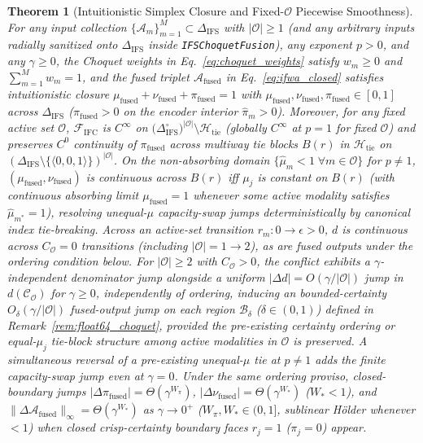 \documentclass[10pt,twocolumn]{article}
\newtheorem{theorem}{Theorem}
\begin{document}
\begin{theorem}[Intuitionistic Simplex Closure and Fixed-$\mathcal{O}$ Piecewise Smoothness]
\label{thm:closure}
For any input collection $\{\mathcal{A}_m\}_{m=1}^M \subset \Delta_{\text{IFS}}$ with
$|\mathcal{O}| \ge 1$ (and any arbitrary inputs radially sanitized onto $\Delta_{\text{IFS}}$
inside \texttt{IFSChoquetFusion}), any exponent $p > 0$, and any $\gamma \ge 0$, the Choquet
weights in Eq.~\eqref{eq:choquet_weights} satisfy $w_m \ge 0$ and $\sum_{m=1}^M w_m = 1$, and
the fused triplet $\mathcal{A}_{\text{fused}}$ in Eq.~\eqref{eq:ifwa_closed} satisfies
intuitionistic closure $\mu_{\text{fused}} + \nu_{\text{fused}} + \pi_{\text{fused}} = 1$ with
$\mu_{\text{fused}}, \nu_{\text{fused}}, \pi_{\text{fused}} \in [0, 1]$ across
$\Delta_{\text{IFS}}$ ($\pi_{\text{fused}} > 0$ on the encoder interior $\hat{\pi}_m > 0$).
Moreover, for any fixed active set $\mathcal{O}$, $\mathcal{F}_{\text{IFC}}$ is $C^\infty$ on
$\big(\Delta_{\text{IFS}}^\circ\big)^{|\mathcal{O}|} \setminus \mathcal{H}_{\text{tie}}$
(globally $C^\infty$ at $p=1$ for fixed $\mathcal{O}$) and preserves $C^0$ continuity of
$\pi_{\text{fused}}$ across multiway tie blocks $B(r)$ in $\mathcal{H}_{\text{tie}}$ on
$(\Delta_{\text{IFS}} \setminus \{\langle 0,0,1\rangle\})^{|\mathcal{O}|}$. On the
non-absorbing domain $\{\hat{\mu}_m < 1\;\forall m\in\mathcal{O}\}$ for $p \neq 1$,
$(\mu_{\text{fused}}, \nu_{\text{fused}})$ is continuous across $B(r)$ iff $\mu_j$ is constant
on $B(r)$ (with continuous absorbing limit $\mu_{\text{fused}}=1$ whenever some active modality
satisfies $\hat{\mu}_{m^*}=1$), resolving unequal-$\mu$ capacity-swap jumps deterministically
by canonical index tie-breaking. Across an active-set transition $r_m : 0 \to \epsilon > 0$,
$d$ is continuous across $C_{\mathcal{O}}=0$ transitions (including
$|\mathcal{O}|=1 \to 2$), as are fused outputs under the ordering condition below. For
$|\mathcal{O}| \ge 2$ with $C_{\mathcal{O}} > 0$, the conflict exhibits a
$\gamma$-independent denominator jump alongside a uniform
$|\Delta d|=O(\gamma/|\mathcal{O}|)$ jump in $d(\mathcal{C}_{\mathcal{O}})$ for
$\gamma\ge0$, independently of ordering, inducing an
bounded-certainty $O_\delta(\gamma/|\mathcal{O}|)$ fused-output jump on each region
$\mathcal{B}_\delta$ ($\delta\in(0,1)$) defined in Remark~\ref{rem:float64_choquet}, provided
the pre-existing certainty ordering or
equal-$\mu_j$ tie-block structure among active modalities in $\mathcal{O}$ is preserved. A
simultaneous reversal of a pre-existing unequal-$\mu$ tie at $p\ne1$ adds the finite
capacity-swap jump even at $\gamma=0$. Under the same ordering proviso, closed-boundary jumps
$|\Delta \pi_{\text{fused}}|
= \Theta(\gamma^{W_\pi})$, $|\Delta \nu_{\text{fused}}| = \Theta(\gamma^{W_*})$ ($W_* < 1$),
and $\|\Delta \mathcal{A}_{\text{fused}}\|_\infty = \Theta(\gamma^{W_*})$ as $\gamma \to 0^+$
($W_\pi, W_* \in (0, 1]$, sublinear Hölder whenever $< 1$) when closed crisp-certainty
boundary faces $r_j=1$ ($\pi_j=0$) appear.
\end{theorem}
\end{document}
